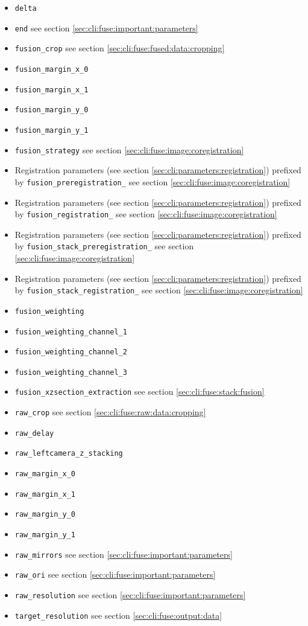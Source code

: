 \begin{itemize}
\item \texttt{delta}
\item \texttt{end} see section \ref{sec:cli:fuse:important:parameters}
\item \texttt{fusion\_crop} see section \ref{sec:cli:fuse:fused:data:cropping}
\item \texttt{fusion\_margin\_x\_0}
\item \texttt{fusion\_margin\_x\_1}
\item \texttt{fusion\_margin\_y\_0}
\item \texttt{fusion\_margin\_y\_1}
\item \texttt{fusion\_strategy}  see section \ref{sec:cli:fuse:image:coregistration}
\item Registration parameters 
(see section \ref{sec:cli:parameters:registration}) prefixed 
by \texttt{fusion\_preregistration\_}
see section \ref{sec:cli:fuse:image:coregistration}
\item Registration parameters 
(see section \ref{sec:cli:parameters:registration}) prefixed 
by \texttt{fusion\_registration\_}
see section \ref{sec:cli:fuse:image:coregistration}
\item Registration parameters 
(see section \ref{sec:cli:parameters:registration}) prefixed
by \texttt{fusion\_stack\_preregistration\_}
see section \ref{sec:cli:fuse:image:coregistration}
\item Registration parameters 
(see section \ref{sec:cli:parameters:registration}) prefixed
by \texttt{fusion\_stack\_registration\_}
see section \ref{sec:cli:fuse:image:coregistration}
\item \texttt{fusion\_weighting}
\item \texttt{fusion\_weighting\_channel\_1}
\item \texttt{fusion\_weighting\_channel\_2}
\item \texttt{fusion\_weighting\_channel\_3}
\item \texttt{fusion\_xzsection\_extraction} see section \ref{sec:cli:fuse:stack:fusion}
\item \texttt{raw\_crop} see section \ref{sec:cli:fuse:raw:data:cropping}
\item \texttt{raw\_delay}
\item \texttt{raw\_leftcamera\_z\_stacking}
\item \texttt{raw\_margin\_x\_0}
\item \texttt{raw\_margin\_x\_1}
\item \texttt{raw\_margin\_y\_0}
\item \texttt{raw\_margin\_y\_1}
\item \texttt{raw\_mirrors} see section \ref{sec:cli:fuse:important:parameters}
\item \texttt{raw\_ori} see section \ref{sec:cli:fuse:important:parameters}
\item \texttt{raw\_resolution} see section \ref{sec:cli:fuse:important:parameters}

\item \texttt{target\_resolution} see section \ref{sec:cli:fuse:output:data}
\end{itemize}





